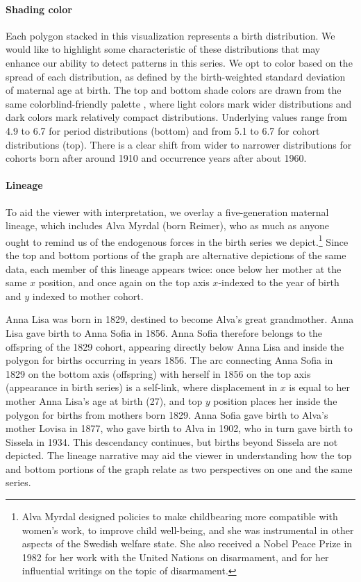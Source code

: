\paragraph{Shading color}
Each polygon stacked in this visualization represents a birth distribution. We would like to highlight some characteristic of these distributions that may enhance our ability to detect patterns in this series. We opt to color based on the spread of each distribution, as defined by the birth-weighted standard deviation of maternal age at birth. The top and bottom shade colors are drawn from the same colorblind-friendly palette \citep{viridis}, where light colors mark wider distributions and dark colors mark relatively compact distributions. Underlying values range from 4.9 to 6.7 for period distributions (bottom) and from 5.1 to 6.7 for cohort distributions (top). There is a clear shift from wider to narrower distributions for cohorts born after around 1910 and occurrence years after about 1960.

\paragraph{Lineage}
To aid the viewer with interpretation, we overlay a five-generation maternal lineage, which includes Alva Myrdal (born Reimer), who as much as anyone ought to remind us of the endogenous forces in the birth series we depict.\footnote{Alva Myrdal designed policies to make childbearing more compatible with women's work, to improve child well-being, and she was instrumental in other aspects of the Swedish welfare state. She also received a Nobel Peace Prize in 1982 for her work with the United Nations on disarmament, and for her influential writings on the topic of disarmament.} Since the top and bottom portions of the graph are alternative depictions of the same data, each member of this lineage appears twice: once below her mother at the same $x$ position, and once again on the top axis $x$-indexed to the year of birth and $y$ indexed to mother cohort. 

Anna Lisa was born in 1829, destined to become Alva's great grandmother. Anna Lisa gave birth to Anna Sofia in 1856. Anna Sofia therefore belongs to the offspring of the 1829 cohort, appearing directly below Anna Lisa and inside the polygon for births occurring in years 1856. The arc connecting Anna Sofia in 1829 on the bottom axis (offspring) with herself in 1856 on the top axis (appearance in birth series) is a self-link, where displacement in $x$ is equal to her mother Anna Lisa's age at birth (27), and top $y$ position places her inside the polygon for births from mothers born 1829. Anna Sofia gave birth to Alva's mother Lovisa in 1877, who gave birth to Alva in 1902, who in turn gave birth to Sissela in 1934. This descendancy continues, but births beyond Sissela are not depicted. The lineage narrative may aid the viewer in understanding how the top and bottom portions of the graph relate as two perspectives on one and the same series. 

